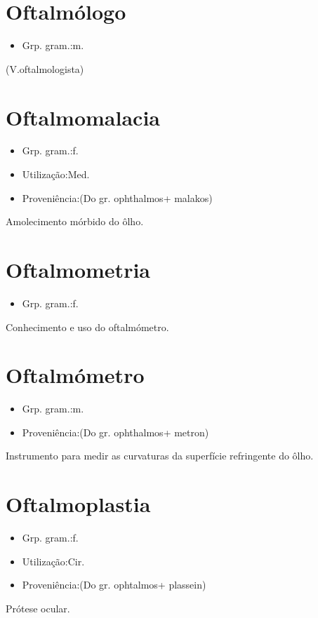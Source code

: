 \section{Oftalmólogo}
\begin{itemize}
\item {Grp. gram.:m.}
\end{itemize}
(V.oftalmologista)
\section{Oftalmomalacia}
\begin{itemize}
\item {Grp. gram.:f.}
\end{itemize}
\begin{itemize}
\item {Utilização:Med.}
\end{itemize}
\begin{itemize}
\item {Proveniência:(Do gr. \textunderscore ophthalmos\textunderscore  + \textunderscore malakos\textunderscore )}
\end{itemize}
Amolecimento mórbido do ôlho.
\section{Oftalmometria}
\begin{itemize}
\item {Grp. gram.:f.}
\end{itemize}
Conhecimento e uso do oftalmómetro.
\section{Oftalmómetro}
\begin{itemize}
\item {Grp. gram.:m.}
\end{itemize}
\begin{itemize}
\item {Proveniência:(Do gr. \textunderscore ophthalmos\textunderscore  + \textunderscore metron\textunderscore )}
\end{itemize}
Instrumento para medir as curvaturas da superfície refringente do ôlho.
\section{Oftalmoplastia}
\begin{itemize}
\item {Grp. gram.:f.}
\end{itemize}
\begin{itemize}
\item {Utilização:Cir.}
\end{itemize}
\begin{itemize}
\item {Proveniência:(Do gr. \textunderscore ophtalmos\textunderscore  + \textunderscore plassein\textunderscore )}
\end{itemize}
Prótese ocular.
